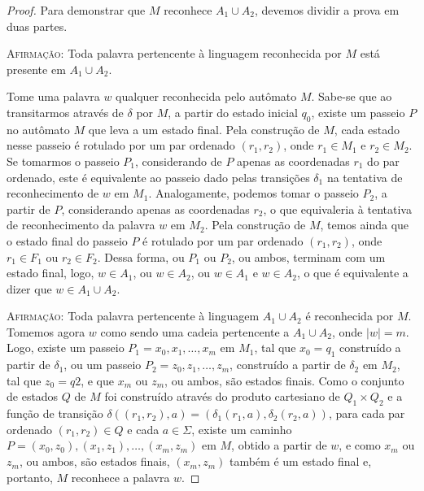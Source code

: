 \begin{proof}
Para demonstrar que $M$ reconhece $A_1 \cup A_2$, devemos dividir a prova em duas partes.

\textsc{Afirmação:} Toda palavra pertencente à linguagem reconhecida por $M$ está presente em $A_1 \cup A_2$.

Tome uma palavra $w$ qualquer reconhecida pelo autômato $M$. Sabe-se que ao transitarmos através de $\delta$ por $M$, a partir do estado inicial $q_0$, existe um passeio $P$ no autômato $M$ que leva a um estado final. Pela construção de $M$, cada estado nesse passeio é rotulado por um par ordenado $(r_1, r_2)$, onde $r_1 \in M_1$ e $r_2 \in M_2$. Se tomarmos o passeio $P_1$, considerando de $P$ apenas as coordenadas $r_1$ do par ordenado, este é equivalente ao passeio dado pelas transições $\delta_1$ na tentativa de reconhecimento de $w$ em $M_1$. Analogamente, podemos tomar o passeio $P_2$, a partir de $P$, considerando apenas as coordenadas $r_2$, o que equivaleria à tentativa de reconhecimento da palavra $w$ em $M_2$. Pela construção de $M$, temos ainda que o estado final do passeio $P$ é rotulado por um par ordenado $(r_1, r_2)$, onde $r_1 \in F_1$ ou $r_2 \in F_2$. Dessa forma, ou $P_1$ ou $P_2$, ou ambos, terminam com um estado final, logo, $w \in A_1$, ou $w \in A_2$, ou $w \in A_1$ e $w \in A_2$, o que é equivalente a dizer que $w \in A_1 \cup A_2$.

\textsc{Afirmação:} Toda palavra pertencente à linguagem $A_1 \cup A_2$ é reconhecida por $M$.
Tomemos agora $w$ como sendo uma cadeia pertencente a $A_1 \cup A_2$, onde $|w| = m$. Logo, existe um passeio $P_1 = x_0, x_1, \ldots, x_m$ em $M_1$, tal que $x_0 = q_1$ construído a partir de $\delta_1$, ou um passeio $P_2 = z_0, z_1, \ldots, z_m$, construído a partir de $\delta_2$ em $M_2$, tal que $z_0 = q2$, e que $x_m$ ou $z_m$, ou ambos, são estados finais. Como o conjunto de estados $Q$ de $M$ foi construído através do produto cartesiano de $Q_1 \times Q_2$ e a função de transição $\delta((r_1, r_2), a) = (\delta_1(r_1, a), \delta_2(r_2, a))$, para cada par ordenado $(r_1, r_2) \in Q$ e cada $a \in \Sigma$, existe um caminho $P = (x_0, z_0), (x_1, z_1), \ldots, (x_m,z_m)$ em $M$, obtido a partir de $w$, e como $x_m$ ou $z_m$, ou ambos, são estados finais, $(x_m, z_m)$ também é um estado final e, portanto, $M$ reconhece a palavra $w$.
\end{proof}